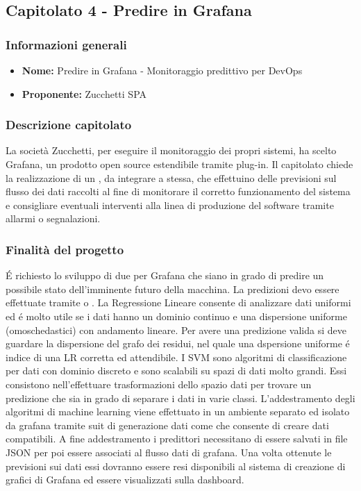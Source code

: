 
\subsection{Capitolato 4 - Predire in Grafana}

		\subsubsection{Informazioni generali}
			\begin{itemize} %
			  \item \textbf{Nome:} Predire in Grafana - Monitoraggio predittivo per DevOps
			  \item \textbf{Proponente:} Zucchetti SPA
			\end{itemize}

		\subsubsection{Descrizione capitolato}
			La società Zucchetti, per eseguire il monitoraggio dei propri sistemi, ha scelto Grafana, un prodotto open source estendibile tramite plug-in.
			Il capitolato chiede la realizzazione di un , da integrare a  stessa, che effettuino delle previsioni sul flusso dei dati raccolti al fine di monitorare il corretto funzionamento del sistema e consigliare eventuali interventi alla linea di produzione del software tramite allarmi o segnalazioni.

		\subsubsection{Finalità del progetto}
			É richiesto lo sviluppo di due  per Grafana che siano in grado di predire un possibile stato dell'imminente futuro della macchina. La predizioni devo essere effettuate tramite  o .
			La Regressione Lineare consente di analizzare dati uniformi ed é molto utile se i dati hanno un dominio continuo e una dispersione uniforme (omoschedastici) con andamento lineare. Per avere una predizione valida si deve guardare la dispersione del grafo dei residui, nel quale una dspersione uniforme é indice di una LR corretta ed attendibile.
			I SVM sono algoritmi di classificazione per dati con dominio discreto e sono scalabili su spazi di dati molto grandi. Essi consistono nell'effettuare trasformazioni dello spazio dati per trovare un predizione che sia in grado di separare i dati in varie classi.
			L'addestramento degli algoritmi di machine learning viene effettuato in un ambiente separato ed isolato da grafana tramite suit di generazione dati come  che consente di creare dati compatibili. A fine addestramento i predittori necessitano di essere salvati in file JSON per poi essere associati al flusso dati di grafana. Una volta ottenute le previsioni sui dati essi dovranno essere resi disponibili al sistema di creazione di grafici di Grafana ed essere visualizzati sulla dashboard.

